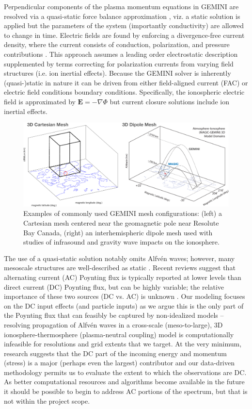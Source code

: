 \documentclass[11pt,letterpaper]{article}
\begin{document}
Perpendicular components of the plasma momentum equations in GEMINI are resolved via a quasi-static force balance approximation \citep{Zettergren:2015b}, viz. a static solution is applied but the parameters of the system  (importantly conductivity) are allowed to change in time.  Electric fields are found by enforcing a divergence-free current density, where the current consists of conduction, polarization, and pressure contributions \citep[e.g. as in][]{Kintner:1985}. This approach assumes a leading order electrostatic description supplemented by terms correcting for polarization currents from varying field structures \citep{Mitchell:1985} (i.e. ion inertial effects).  Because the GEMINI solver is inherently (quasi-)static in nature it can be driven from either field-aligned current (FAC) or electric field conditions boundary conditions.  Specifically, the ionospheric electric field is approximated by $\mathbf{E}=-\nabla \Phi$ but current closure solutions include ion inertial effects.  
\begin{figure}
  \includegraphics[width=\textwidth]{./figures/GEMINI_mesh-crop.pdf}
  \caption{Examples of commonly used GEMINI mesh configurations: (left) a Cartesian mesh centered near the geomagnetic pole near Resolute Bay Canada, (right) an interhemispheric dipole mesh used with studies of infrasound and gravity wave impacts on the ionosphere.  }
  \label{fig:GEMINI}
\end{figure}

The use of a quasi-static solution notably omits Alfv\'en waves; however, many mesoscale structures are well-described as static \citep[e.g.][]{Lynch:2015}.  Recent reviews suggest that alternating current (AC) Poynting flux is typically reported at lower levels than direct current (DC) Poynting flux, but can be highly variable; the relative importance of these two sources (DC vs. AC) is unknown \citep{Kaeppler:2022}.  Our modeling focuses on the DC input effects (and particle inputs) as we argue this is the only part of the Poynting flux that can feasibly be captured by non-idealized models -- resolving propagation of Alfv\'en waves in a cross-scale (meso-to-large), 3D ionosphere-thermosphere (plasma-neutral coupling) model is computationally infeasible for resolutions and grid extents that we target.   At the very minimum, research suggests that the DC part of the incoming energy and momentum (stress) is a major (perhaps even the largest) contributor and our data-driven methodology permits us to evaluate the extent to which the observations are DC.  As better computational resources and algorithms become available in the future it should be possible to begin to address AC portions of the spectrum, but that is not within the project scope.  
\end{document}
